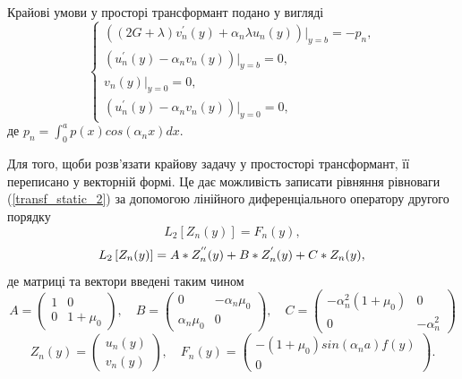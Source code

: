 Крайові умови у просторі трансформант подано у вигляді
\begin{equation}\label{transf_bound_static_2}
    \begin{cases}
        \left( (2G + \lambda)v_n^{'}(y) + \alpha_n \lambda u_n(y) \right)|_{y=b} = -p_n, \\
        \left(u_n^{'}(y) - \alpha_n v_n(y)  \right)|_{y=b} = 0, \\
        v_n(y)|_{y=0} = 0, \\
        \left(u_n^{'}(y) - \alpha_n v_n(y)  \right)|_{y=0} = 0,
    \end{cases}
\end{equation}
де $p_n = \int_{0}^{a} p(x) cos(\alpha_n x) dx$.

Для того, щоби розв'язати крайову задачу у простосторі трансформант, її переписано у векторній формі.
Це дає можливість записати рівняння рівноваги (\ref{transf_static_2}) за допомогою лінійного диференціального оператору другого порядку
\begin{equation}\label{transf_mat_static_2}
    L_2\left[ Z_n(y) \right] = F_n(y),
\end{equation}
\begin{equation}
    L_2\left[ Z_n(y) \right] = A * Z_n^{''}(y) + B * Z_n^{'}(y) + C * Z_n(y), \nonumber \\
\end{equation}
де матриці та вектори введені таким чином
\begin{equation*}
    A = \begin{pmatrix}
        1 & 0 \\
        0 & 1 + \mu_0
    \end{pmatrix}, \quad
    B = \begin{pmatrix}
        0 & -\alpha_n \mu_0 \\
        \alpha_n \mu_0 & 0
    \end{pmatrix}, \quad
    C = \begin{pmatrix}
        -\alpha_n^2(1 + \mu_0) & 0 \\
        0 & -\alpha_n^2
    \end{pmatrix}
\end{equation*}
\begin{equation*}
    Z_n(y) = \begin{pmatrix}
        u_n(y) \\
        v_n(y)
    \end{pmatrix}, \quad 
    F_n(y) = \begin{pmatrix}
        -(1 + \mu_0)sin(\alpha_n a) f(y) \\
        0
    \end{pmatrix}.
\end{equation*}
